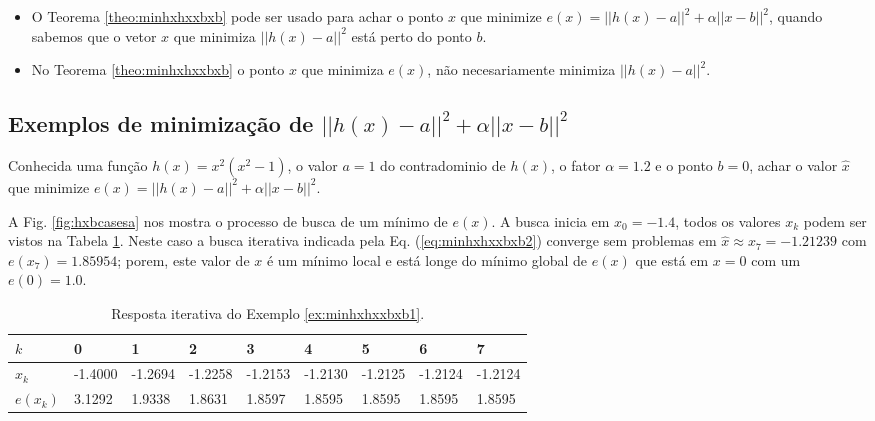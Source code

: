 \begin{tcbattention}
\begin{itemize}
\item O Teorema \ref{theo:minhxhxxbxb} pode ser usado para achar o ponto $x$
que minimize $e(x)=||h(x)-a||^2+\alpha||x-b||^2$,
quando sabemos que o vetor $x$ que minimiza $||h(x)-a||^2$ 
está perto do ponto $b$.
\item No Teorema \ref{theo:minhxhxxbxb} o ponto $x$ que minimiza $e(x)$, 
não necesariamente minimiza  $||h(x)-a||^2$.
\end{itemize}
\end{tcbattention}


\subsection{Exemplos de minimização de $||h(x)-a||^2+\alpha ||x-b||^2$}


\begin{example}\label{ex:minhxhxxbxb1}
Conhecida uma função $h(x)=x^2(x^2-1)$, o valor $a=1$ do contradominio de $h(x)$,
o fator $\alpha=1.2$ e o ponto $b=0$,
achar o valor $\hat{x}$ que minimize $e(x)=||h(x)-a||^2+\alpha||x-b||^2$.
\end{example}
\begin{SolutionT}\label{sol:minhxhxxbxb1}


 A Fig. \ref{fig:hxbcasesa} nos mostra o processo de busca de um mínimo
 de $e(x)$. A busca inicia em $x_0=-1.4$,
 todos os valores $x_{k}$ podem ser vistos na Tabela \ref{tab:hxbcases1}. 
Neste caso a busca iterativa indicada pela Eq. (\ref{eq:minhxhxxbxb2}) converge sem problemas 
em $\hat{x}\approx x_7 =-1.21239$ com $e(x_7)=1.85954$; porem, 
 este valor de $x$ é um mínimo local e está longe do mínimo
 global de  $e(x)$ que está em $x=0$ com um $e(0)=1.0$.

\end{SolutionT}



\begin{table}[!h]
\centering
\begin{tabular}{|l|l|l|l|l|l|l|l|l|}
\hline
$k$      & 0 & 1 & 2 & 3 & 4 & 5 & 6 & 7 \\ \hline
$x_k$    & -1.4000 & -1.2694 & -1.2258 & -1.2153 & -1.2130 & -1.2125 & -1.2124 & -1.2124 \\ \hline
$e(x_k)$ & 3.1292 & 1.9338 & 1.8631 & 1.8597 & 1.8595 & 1.8595 & 1.8595 & 1.8595 \\ \hline
\end{tabular}
\caption{Resposta iterativa do Exemplo \ref{ex:minhxhxxbxb1}.}
\label{tab:hxbcases1}
\end{table}

